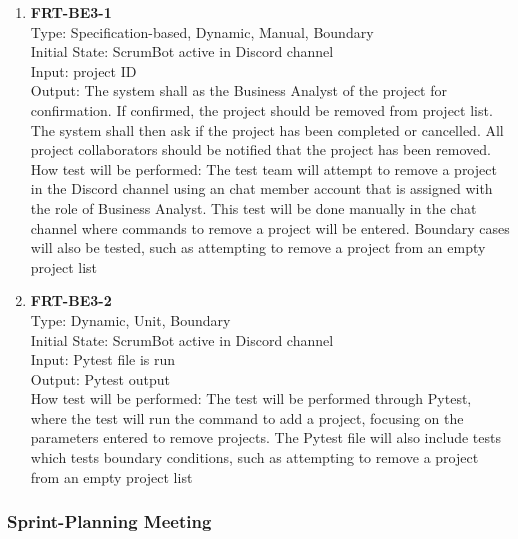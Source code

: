 \documentclass[12pt, titlepage]{article}
\begin{document}
\begin{enumerate}
    \item{\textbf{FRT-BE3-1}}\\
    Type: Specification-based, Dynamic, Manual, Boundary\\
    Initial State: ScrumBot active in Discord channel\\
    Input: project ID\\
    Output: The system shall as the Business Analyst of the project for confirmation. If confirmed, the project should be removed from project list. The system shall then ask if the project has been completed or cancelled. All project collaborators should be notified that the project has been removed.\\
    How test will be performed: The test team will attempt to remove a project in the Discord channel using an chat member account that is assigned with the role of Business Analyst. This test will be done manually in the chat channel where commands to remove a project will be entered. Boundary cases will also be tested, such as attempting to remove a project from an empty project list\\
    
    \item{\textbf{FRT-BE3-2}}\\
    Type: Dynamic, Unit, Boundary\\
    Initial State: ScrumBot active in Discord channel\\
    Input: Pytest file is run\\
    Output: Pytest output\\
    How test will be performed: The test will be performed through Pytest, where the test will run the command to add a project, focusing on the parameters entered to remove projects. The Pytest file will also include tests which tests boundary conditions, such as attempting to remove a project from an empty project list\\
\end{enumerate}

\subsubsection{Sprint-Planning Meeting}
\end{document}
